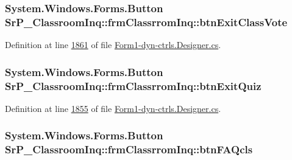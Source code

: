 \hypertarget{class_sr_p___classroom_inq_1_1frm_classrrom_inq_a86eaeeecc049840138ceb3aa2d9bf9ef}{
\subsubsection[{btn\-Exit\-Class\-Vote}]{\setlength{\rightskip}{0pt plus 5cm}\-System.\-Windows.\-Forms.\-Button {\bf \-Sr\-P\-\_\-\-Classroom\-Inq\-::frm\-Classrrom\-Inq\-::btn\-Exit\-Class\-Vote}}}
\label{class_sr_p___classroom_inq_1_1frm_classrrom_inq_a86eaeeecc049840138ceb3aa2d9bf9ef}


\-Definition at line \hyperlink{_form1-dyn-ctrls_8_designer_8cs_source_l01861}{1861} of file \hyperlink{_form1-dyn-ctrls_8_designer_8cs_source}{\-Form1-\/dyn-\/ctrls.\-Designer.\-cs}.

\hypertarget{class_sr_p___classroom_inq_1_1frm_classrrom_inq_a207f1be65a3e42071f8375603e4b854c}{
\subsubsection[{btn\-Exit\-Quiz}]{\setlength{\rightskip}{0pt plus 5cm}\-System.\-Windows.\-Forms.\-Button {\bf \-Sr\-P\-\_\-\-Classroom\-Inq\-::frm\-Classrrom\-Inq\-::btn\-Exit\-Quiz}}}
\label{class_sr_p___classroom_inq_1_1frm_classrrom_inq_a207f1be65a3e42071f8375603e4b854c}


\-Definition at line \hyperlink{_form1-dyn-ctrls_8_designer_8cs_source_l01855}{1855} of file \hyperlink{_form1-dyn-ctrls_8_designer_8cs_source}{\-Form1-\/dyn-\/ctrls.\-Designer.\-cs}.

\hypertarget{class_sr_p___classroom_inq_1_1frm_classrrom_inq_a1c53d39fe22e25d8c00aa7d8c97eb9a8}{
\subsubsection[{btn\-F\-A\-Qcls}]{\setlength{\rightskip}{0pt plus 5cm}\-System.\-Windows.\-Forms.\-Button {\bf \-Sr\-P\-\_\-\-Classroom\-Inq\-::frm\-Classrrom\-Inq\-::btn\-F\-A\-Qcls}}}
\label{class_sr_p___classroom_inq_1_1frm_classrrom_inq_a1c53d39fe22e25d8c00aa7d8c97eb9a8}


